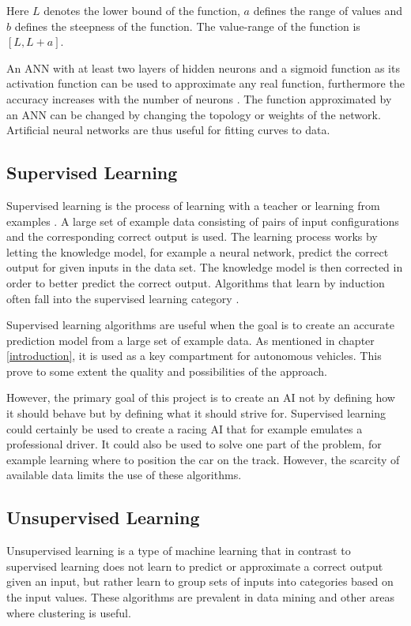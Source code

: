 \noindent
Here $L$ denotes the lower bound of the function, $a$ defines the range of values and $b$ defines the steepness of the function. The value-range of the function is $[L, L+a]$. 

An ANN with at least two layers of hidden neurons and a sigmoid function as its activation function can be used to approximate any real function, furthermore the accuracy increases with the number of neurons \cite{mitchel:approximation}. The function approximated by an ANN can be changed by changing the topology or weights of the network. Artificial neural networks are thus useful for fitting curves to data. 



\subsection{Supervised Learning}
Supervised learning is the process of learning with a teacher or learning from examples \cite{haykin:supervised}. A large set of example data consisting of pairs of input configurations and the corresponding correct output is used. The learning process works by letting the knowledge model, for example a neural network, predict the correct output for given inputs in the data set. The knowledge model is then corrected in order to better predict the correct output. Algorithms that learn by induction often fall into the supervised learning category \cite{glossary}. 

Supervised learning algorithms are useful when the goal is to create an accurate prediction model from a large set of example data. As mentioned in chapter \ref{introduction}, it is used as a key compartment for autonomous vehicles\cite{}. This prove to some extent the quality and possibilities of the approach.

However, the primary goal of this project is to create an AI not by defining how it should behave but by defining what it should strive for. Supervised learning could certainly be used to create a racing AI that for example emulates a professional driver. It could also be used to solve one part of the problem, for example learning where to position the car on the track. However, the scarcity of available data limits the use of these algorithms.  



\subsection{Unsupervised Learning}
Unsupervised learning is a type of machine learning that in contrast to supervised learning does not learn to predict or approximate a correct output given an input, but rather learn to group sets of inputs into categories based on the input values. These algorithms are prevalent in data mining and other areas where clustering is useful. 



